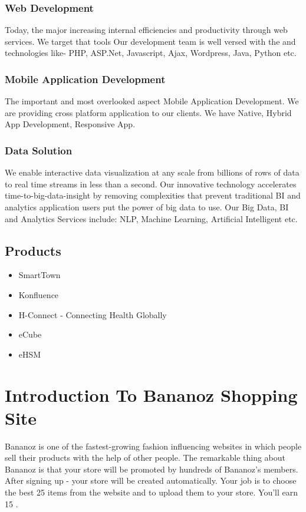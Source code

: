 \subsubsection{Web Development }
Today, the major increasing internal efficiencies and productivity through web services. We target that tools Our development team is well versed with the and technologies like- PHP, ASP.Net, Javascript, Ajax, Wordpress, Java, Python etc.


\subsubsection{Mobile Application Development }
The important and most overlooked aspect Mobile Application Development. We are providing cross platform application to our clients. We have Native, Hybrid App Development, Responsive App.


\subsubsection{Data Solution }
We enable interactive data visualization at any scale from billions of rows of data to real time streams in less than a second. Our innovative technology accelerates time-to-big-data-insight by removing complexities that prevent traditional BI and analytics application users put the power of big data to use. Our Big Data, BI and Analytics Services include: NLP, Machine Learning, Artificial Intelligent etc.

\subsection{Products}
\begin{itemize} 


\item	SmartTown
\item	Konfluence
\item	H-Connect - Connecting Health Globally
\item	eCube
\item	eHSM  
      
\end{itemize}




\section{Introduction To Bananoz Shopping Site }
                             Bananoz is one of the fastest-growing fashion influencing websites in which people sell their products with the help of other people. The remarkable thing about Bananoz is that your store will be promoted by hundreds of Bananoz's members. After signing up - your store will be created automatically. Your job is to choose the best 25 items from the website and to upload them to your store. You'll earn 15%
                             .
